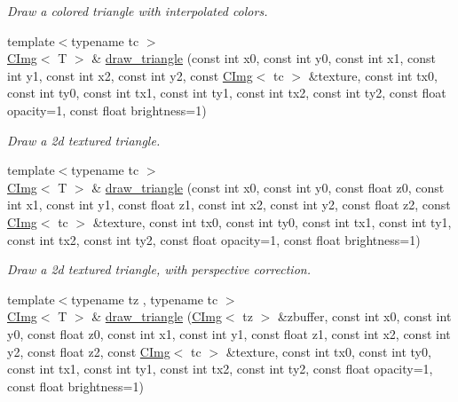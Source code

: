 \begin{DoxyCompactItemize}
\begin{DoxyCompactList}\small\item\em Draw a colored triangle with interpolated colors. \item\end{DoxyCompactList}\item 
{\footnotesize template$<$typename tc $>$ }\\\hyperlink{structcimg__library_1_1CImg}{CImg}$<$ T $>$ \& \hyperlink{structcimg__library_1_1CImg_aed9f231a2586832f9e3edbab43dba19f}{draw\_\-triangle} (const int x0, const int y0, const int x1, const int y1, const int x2, const int y2, const \hyperlink{structcimg__library_1_1CImg}{CImg}$<$ tc $>$ \&texture, const int tx0, const int ty0, const int tx1, const int ty1, const int tx2, const int ty2, const float opacity=1, const float brightness=1)
\begin{DoxyCompactList}\small\item\em Draw a 2d textured triangle. \item\end{DoxyCompactList}\item 
\hypertarget{structcimg__library_1_1CImg_acbc11ace0f311f4424ab3f9e87b46d49}{
{\footnotesize template$<$typename tc $>$ }\\\hyperlink{structcimg__library_1_1CImg}{CImg}$<$ T $>$ \& \hyperlink{structcimg__library_1_1CImg_acbc11ace0f311f4424ab3f9e87b46d49}{draw\_\-triangle} (const int x0, const int y0, const float z0, const int x1, const int y1, const float z1, const int x2, const int y2, const float z2, const \hyperlink{structcimg__library_1_1CImg}{CImg}$<$ tc $>$ \&texture, const int tx0, const int ty0, const int tx1, const int ty1, const int tx2, const int ty2, const float opacity=1, const float brightness=1)}
\label{structcimg__library_1_1CImg_acbc11ace0f311f4424ab3f9e87b46d49}

\begin{DoxyCompactList}\small\item\em Draw a 2d textured triangle, with perspective correction. \item\end{DoxyCompactList}\item 
\hypertarget{structcimg__library_1_1CImg_aa64adcdb3786749f53e32ce2d444d223}{
{\footnotesize template$<$typename tz , typename tc $>$ }\\\hyperlink{structcimg__library_1_1CImg}{CImg}$<$ T $>$ \& \hyperlink{structcimg__library_1_1CImg_aa64adcdb3786749f53e32ce2d444d223}{draw\_\-triangle} (\hyperlink{structcimg__library_1_1CImg}{CImg}$<$ tz $>$ \&zbuffer, const int x0, const int y0, const float z0, const int x1, const int y1, const float z1, const int x2, const int y2, const float z2, const \hyperlink{structcimg__library_1_1CImg}{CImg}$<$ tc $>$ \&texture, const int tx0, const int ty0, const int tx1, const int ty1, const int tx2, const int ty2, const float opacity=1, const float brightness=1)}
\label{structcimg__library_1_1CImg_aa64adcdb3786749f53e32ce2d444d223}


\end{DoxyCompactItemize}
